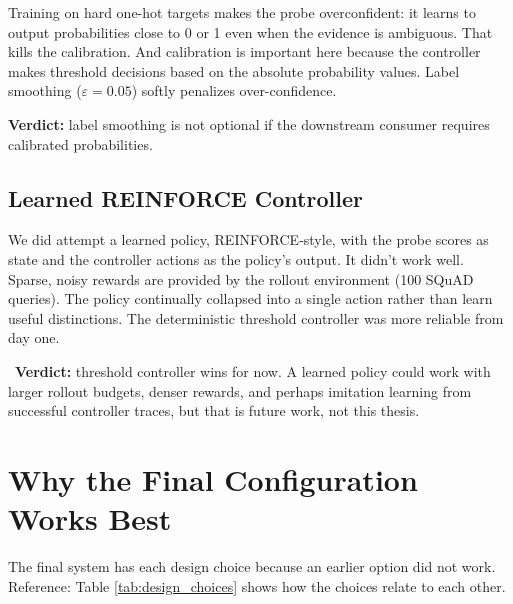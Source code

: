 Training on hard one-hot targets makes the probe overconfident: it learns to output probabilities close to 0 or 1 even when the evidence is ambiguous. That kills the calibration. And calibration is important here because the controller makes threshold decisions based on the absolute probability values. Label smoothing ($\varepsilon = 0.05$) softly penalizes over-confidence.

\textbf{Verdict:} label smoothing is not optional if the downstream consumer requires calibrated probabilities.

\subsection{Learned REINFORCE Controller}

We did attempt a learned policy,  REINFORCE-style, with the probe scores as state and the controller actions as the policy's output. It didn't work well. Sparse, noisy rewards are provided by the rollout environment (100 SQuAD queries). The policy continually collapsed into a single action rather than learn useful distinctions. The deterministic threshold controller was more reliable from day one.

 \textbf{Verdict:} threshold controller wins for now. A learned policy could work with larger rollout budgets, denser rewards, and perhaps imitation learning from successful controller traces, but that is future work, not this thesis.

\section{Why the Final Configuration Works Best}
\label{sec:why_best}

The final system has each design choice because an earlier option did not work. Reference: Table \ref{tab:design_choices} shows how the choices relate to each other.

